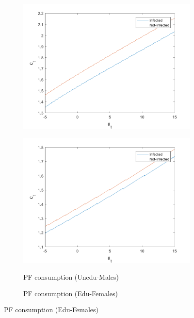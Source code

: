 \begin{figure}[H]
\begin{subfigure}{0.5\textwidth}
   \includegraphics[width=\linewidth,height = 0.22\textheight]{figures/mio/FIG6.png}
    \label{fig_dert}
\end{subfigure}
\hspace*{\fill}
\begin{subfigure}{0.5\textwidth}\caption{PF consumption (Unedu-Males)}
   \includegraphics[width=\linewidth,height = 0.22\textheight]{figures/mio/FIG5.png}
    \label{fig:x_b}
\end{subfigure}
\bigskip
\begin{subfigure}{0.5\textwidth}\caption{PF consumption (Edu-Females)}

\end{subfigure}
\end{figure}
